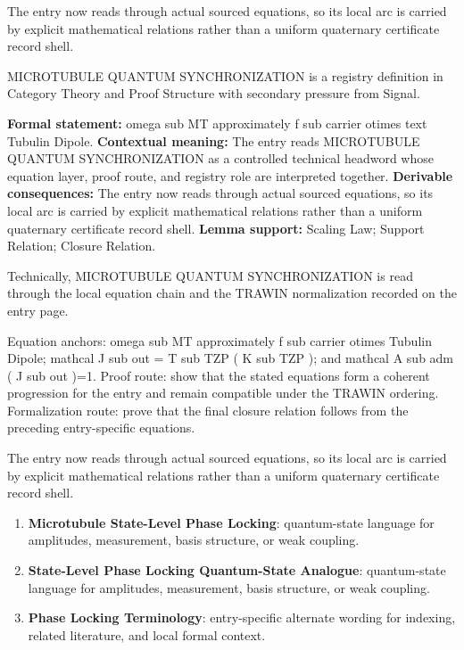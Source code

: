The entry now reads through actual sourced equations, so its local arc is carried by explicit mathematical relations rather than a uniform quaternary certificate record shell.
\clearpage


\begingroup\small
{}
MICROTUBULE QUANTUM SYNCHRONIZATION is a registry definition in Category Theory and Proof Structure with secondary pressure from Signal.

\begingroup\footnotesize\setlength{\emergencystretch}{3em}\sloppy
\textbf{Formal statement:} omega sub MT approximately f sub carrier otimes text Tubulin Dipole. \textbf{Contextual meaning:} The entry reads MICROTUBULE QUANTUM SYNCHRONIZATION as a controlled technical headword whose equation layer, proof route, and registry role are interpreted together. \textbf{Derivable consequences:} The entry now reads through actual sourced equations, so its local arc is carried by explicit mathematical relations rather than a uniform quaternary certificate record shell. \textbf{Lemma support:} Scaling Law; Support Relation; Closure Relation.\par
\endgroup

Technically, MICROTUBULE QUANTUM SYNCHRONIZATION is read through the local equation chain and the TRAWIN normalization recorded on the entry page.

Equation anchors: omega sub MT approximately f sub carrier otimes Tubulin Dipole; mathcal J sub out = T sub TZP ( K sub TZP ); and mathcal A sub adm ( J sub out )=1. Proof route: show that the stated equations form a coherent progression for the entry and remain compatible under the TRAWIN ordering. Formalization route: prove that the final closure relation follows from the preceding entry-specific equations.

The entry now reads through actual sourced equations, so its local arc is carried by explicit mathematical relations rather than a uniform quaternary certificate record shell.
\endgroup

\begin{enumerate}[leftmargin=1.6em,itemsep=6pt,topsep=4pt]
\item \textbf{Microtubule State-Level Phase Locking}: quantum-state language for amplitudes, measurement, basis structure, or weak coupling.
\item \textbf{State-Level Phase Locking Quantum-State Analogue}: quantum-state language for amplitudes, measurement, basis structure, or weak coupling.
\item \textbf{Phase Locking Terminology}: entry-specific alternate wording for indexing, related literature, and local formal context.
\end{enumerate}

